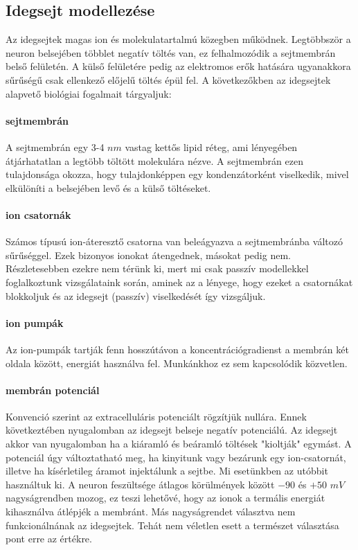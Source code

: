 \FloatBarrier
\subsection{Idegsejt modellezése}
Az idegsejtek magas ion és molekulatartalmú közegben működnek. Legtöbbször a neuron belsejében többlet negatív töltés van, ez felhalmozódik a sejtmembrán belső felületén. A külső felületére pedig az elektromos erők hatására ugyanakkora sűrűségű csak ellenkező előjelű töltés épül fel. A következőkben az idegsejtek alapvető biológiai fogalmait tárgyaljuk:

\paragraph{sejtmembrán}
A sejtmembrán egy 3-4 $nm$ vastag kettős lipid réteg, ami lényegében átjárhatatlan a legtöbb töltött molekulára nézve. A sejtmembrán ezen tulajdonsága okozza, hogy tulajdonképpen egy kondenzátorként viselkedik, mivel elkülöníti a belsejében levő és a külső töltéseket.

\paragraph{ion csatornák}
Számos típusú ion-áteresztő csatorna van beleágyazva a sejtmembránba változó sűrűséggel. Ezek bizonyos ionokat átengednek, másokat pedig nem. Részletesebben ezekre nem térünk ki, mert mi csak passzív modellekkel foglalkoztunk vizsgálataink során, aminek az a lényege, hogy ezeket a csatornákat blokkoljuk és az idegsejt (passzív) viselkedését így vizsgáljuk.

\paragraph{ion pumpák}
Az ion-pumpák tartják fenn hosszútávon a koncentrációgradienst a membrán két oldala között, energiát használva fel. Munkánkhoz ez sem kapcsolódik közvetlen.

\paragraph{membrán potenciál}
Konvenció szerint az extracelluláris potenciált rögzítjük nullára. Ennek következtében nyugalomban az idegsejt belseje negatív potenciálú. Az idegsejt akkor van nyugalomban ha a kiáramló és beáramló töltések "kioltják" egymást. A potenciál úgy változtatható meg, ha kinyitunk vagy bezárunk egy ion-csatornát, illetve ha kísérletileg áramot injektálunk a sejtbe. Mi esetünkben az utóbbit használtuk ki.
A neuron feszültsége átlagos körülmények között $-90$ és $+50$ $mV$ nagyságrendben mozog, ez teszi lehetővé, hogy az ionok a termális energiát kihasználva átlépjék a membránt. Más nagyságrendet választva nem funkcionálnának az idegsejtek. Tehát nem véletlen esett a természet választása pont erre az értékre.

